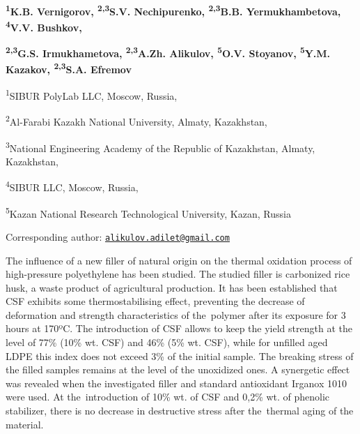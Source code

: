 
\begin{articleheader}

{\bfseries \textsuperscript{1}K.B. Vernigorov, \textsuperscript{2,3}S.V.
Nechipurenko, \textsuperscript{2,3}B.B. Yermukhambetova,
\textsuperscript{4}V.V. Bushkov,}

{\bfseries \textsuperscript{2,3}G.S. Irmukhametova,
\textsuperscript{2,3}A.Zh. Alikulov\textsuperscript{\envelope },
\textsuperscript{5}O.V. Stoyanov, \textsuperscript{5}Y.M. Kazakov,
\textsuperscript{2,3}S.A. Efremov}
\end{articleheader}

\begin{affiliation}
\textsuperscript{1}SIBUR PolyLab LLC, Moscow, Russia,

\textsuperscript{2}Al-Farabi Kazakh National University, Almaty,
Kazakhstan,

\textsuperscript{3}National Engineering Academy of the Republic of
Kazakhstan, Almaty, Kazakhstan,

\textsuperscript{4}SIBUR LLC, Moscow, Russia,

\textsuperscript{5}Kazan National Research Technological University,
Kazan, Russia

\raggedright Corresponding author: \href{mailto:alikulov.adilet@gmail.com}{\nolinkurl{alikulov.adilet@gmail.com}}
\end{affiliation}

The influence of a new filler of natural origin on the thermal oxidation
process of high-pressure polyethylene has been studied. The studied
filler is carbonized rice husk, a waste product of agricultural
production. It has been established that CSF exhibits some
thermostabilising effect, preventing the decrease of deformation and
strength characteristics of the~polymer after its exposure for 3 hours
at 170ºC. The introduction of CSF allows to keep the yield strength at
the level of 77\% (10\% wt. CSF) and 46\% (5\% wt. CSF), while for
unfilled aged LDPE this index does not exceed 3\% of the initial sample.
The breaking stress of the filled samples remains at the level of the
unoxidized ones. A synergetic effect was revealed when the investigated
filler and standard antioxidant Irganox 1010 were used. At
the~introduction of 10\% wt. of CSF and 0,2\% wt. of phenolic
stabilizer, there is no decrease in destructive stress after the~thermal
aging of the material.

